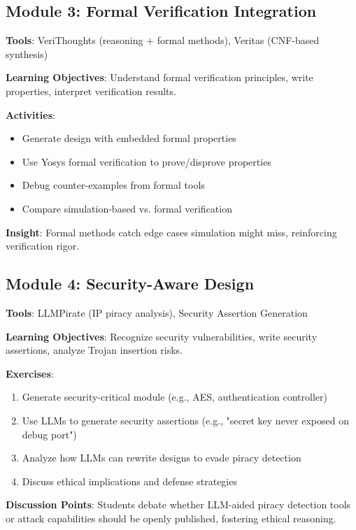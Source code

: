 \documentclass[10pt,conference]{IEEEtran}
\begin{document}
\subsection{Module 3: Formal Verification Integration}

\textbf{Tools}: VeriThoughts (reasoning + formal methods), Veritas (CNF-based synthesis)

\textbf{Learning Objectives}: Understand formal verification principles, write properties, interpret verification results.

\textbf{Activities}:
\begin{itemize}
    \item Generate design with embedded formal properties
    \item Use Yosys formal verification to prove/disprove properties
    \item Debug counter-examples from formal tools
    \item Compare simulation-based vs. formal verification
\end{itemize}

\textbf{Insight}: Formal methods catch edge cases simulation might miss, reinforcing verification rigor.

\subsection{Module 4: Security-Aware Design}

\textbf{Tools}: LLMPirate (IP piracy analysis), Security Assertion Generation

\textbf{Learning Objectives}: Recognize security vulnerabilities, write security assertions, analyze Trojan insertion risks.

\textbf{Exercises}:
\begin{enumerate}
    \item Generate security-critical module (e.g., AES, authentication controller)
    \item Use LLMs to generate security assertions (e.g., "secret key never exposed on debug port")
    \item Analyze how LLMs can rewrite designs to evade piracy detection
    \item Discuss ethical implications and defense strategies
\end{enumerate}

\textbf{Discussion Points}: Students debate whether LLM-aided piracy detection tools or attack capabilities should be openly published, fostering ethical reasoning.
\end{document}
